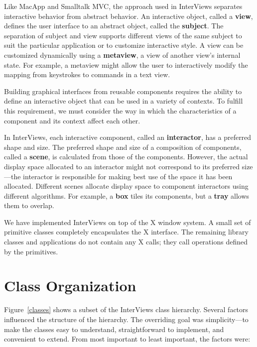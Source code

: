 Like MacApp\cite{macapp} and Smalltalk MVC\cite{smalltalk:mvc}, the approach
used in InterViews separates interactive behavior from abstract behavior.
An interactive object, called a {\bf view}, defines the user interface to an
abstract object, called the {\bf subject}.  The separation of subject and
view supports different views of the same subject to suit the particular
application or to customize interactive style.  A view can be customized
dynamically using a {\bf metaview}, a view of another view's internal state.
For example, a metaview might allow the user to interactively modify the
mapping from keystrokes to commands in a text view.

Building graphical interfaces from reusable components
requires the ability to define an interactive object
that can be used in a variety of contexts.
To fulfill this requirement, we must consider the way in which the
characteristics of a component and its context affect each other.

In InterViews, each interactive component,
called an {\bf interactor}, has a
preferred shape and size.  The preferred
shape and size of a composition of components, called a {\bf scene},
is calculated from those of the components.  However, the actual display
space allocated to an interactor might not correspond
to its preferred size---the interactor is responsible for making
best use of the space it has
been allocated.  Different scenes allocate display space to component
interactors using different algorithms.  For example, a {\bf box} tiles its
components, but a {\bf tray} allows them to overlap.

We have implemented InterViews on top of the X window system\cite{x:windows}.
A small set of primitive classes completely encapsulates
the X interface.
The remaining library classes and
applications do not contain any X calls; they call operations
defined by the primitives.

\section{Class Organization}

\begin{figure*}
\vspace{3.9in}
\vspace{1ex}
\caption{InterViews class hierarchy}
\label{classes}
\end{figure*}

Figure~\ref{classes} shows a subset of the InterViews class hierarchy.
Several factors influenced the structure of the hierarchy.
The overriding goal was simplicity---to make the classes easy to understand,
straightforward to implement, and convenient to extend.
From most important to least important, the factors were:

